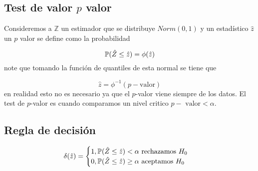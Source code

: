 \documentclass{assignment}
\begin{document}
\subsection*{Test de valor $p$ valor}
Consideremos a $\mathbb{Z}$ un estimador que se distribuye $Norm(0,1)$ y un estadístico $\hat{z}$ un $p$ valor se define como la probabilidad 

\[
\mathbb{P}(\hat{Z} \leq \hat{z})= \phi(\hat{z})
\]
note que tomando la función de quantiles de esta normal se tiene que 

\[
 \hat{z}= \phi^{-1}(p-\text{valor})
\]
en realidad esto no es necesario ya que el $p$-valor viene siempre de los datos. El test de $p$-valor es cuando comparamos un nivel critico $p-\text{ valor} < \alpha$. 

\subsection{Regla de decisión}

\[ 
\delta(\hat{z})=\begin{cases}
1, \mathbb{P}(\hat{Z} \leq \hat{z} ) < \alpha \text{ rechazamos } H_0 \\
0, \mathbb{P}(\hat{Z} \leq \hat{z} ) \geq \alpha \text{ aceptamos } H_0
\end{cases}
\]
\end{document}
